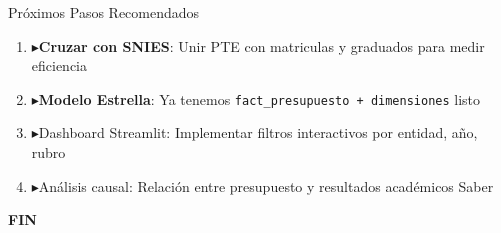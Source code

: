 \documentclass[aspectratio=169,10pt,spanish]{beamer}
\newcommand{\flecha}{\textcolor{violetaobs}{\textbf{$\blacktriangleright$}}}
\begin{document}
\begin{frame}{Próximos Pasos Recomendados}
\begin{enumerate}
  \item \flecha \textbf{Cruzar con SNIES}: Unir PTE con matriculas y graduados para medir eficiencia
  \item \flecha \textbf{Modelo Estrella}: Ya tenemos \texttt{fact\_presupuesto + dimensiones} listo
  \item \flecha Dashboard Streamlit: Implementar filtros interactivos por entidad, año, rubro
  \item \flecha Análisis causal: Relación entre presupuesto y resultados académicos Saber
\end{enumerate}

\vspace{1cm}
\begin{center}
\Huge \textbf{FIN}
\end{center}
\end{frame}
\end{document}

